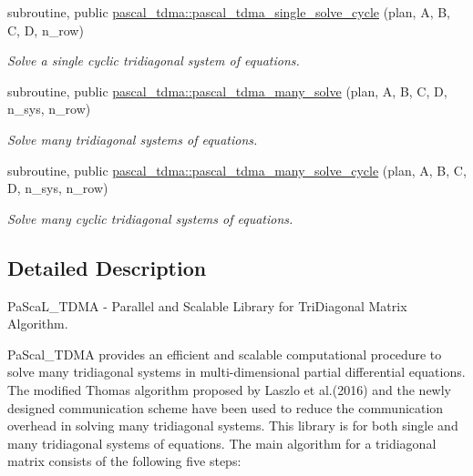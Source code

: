 \begin{DoxyCompactItemize}
subroutine, public \hyperlink{namespacepascal__tdma_ac8e377fa86c75126380f0196f6046043}{pascal\+\_\+tdma\+::pascal\+\_\+tdma\+\_\+single\+\_\+solve\+\_\+cycle} (plan, A, B, C, D, n\+\_\+row)
\begin{DoxyCompactList}\small\item\em Solve a single cyclic tridiagonal system of equations. \end{DoxyCompactList}\item 
subroutine, public \hyperlink{namespacepascal__tdma_afa0c78b8377f5fe1059907befda3c940}{pascal\+\_\+tdma\+::pascal\+\_\+tdma\+\_\+many\+\_\+solve} (plan, A, B, C, D, n\+\_\+sys, n\+\_\+row)
\begin{DoxyCompactList}\small\item\em Solve many tridiagonal systems of equations. \end{DoxyCompactList}\item 
subroutine, public \hyperlink{namespacepascal__tdma_acbaed65e67ecbfd92a8f1d51d1b69fd5}{pascal\+\_\+tdma\+::pascal\+\_\+tdma\+\_\+many\+\_\+solve\+\_\+cycle} (plan, A, B, C, D, n\+\_\+sys, n\+\_\+row)
\begin{DoxyCompactList}\small\item\em Solve many cyclic tridiagonal systems of equations. \end{DoxyCompactList}\end{DoxyCompactItemize}


\subsection{Detailed Description}
Pa\+Sca\+L\+\_\+\+T\+D\+MA -\/ Parallel and Scalable Library for Tri\+Diagonal Matrix Algorithm. 

Pa\+Scal\+\_\+\+T\+D\+MA provides an efficient and scalable computational procedure to solve many tridiagonal systems in multi-\/dimensional partial differential equations. The modified Thomas algorithm proposed by Laszlo et al.(2016) and the newly designed communication scheme have been used to reduce the communication overhead in solving many tridiagonal systems. This library is for both single and many tridiagonal systems of equations. The main algorithm for a tridiagonal matrix consists of the following five steps\+:

